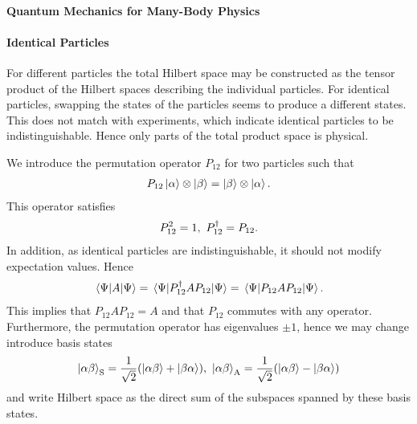 \paragraph{Quantum Mechanics for Many-Body Physics}

\paragraph{Identical Particles}
For different particles the total Hilbert space may be constructed as the tensor product of the Hilbert spaces describing the individual particles. For identical particles, swapping the states of the particles seems to produce a different states. This does not match with experiments, which indicate identical particles to be indistinguishable. Hence only parts of the total product space is physical.

We introduce the permutation operator $P_{12}$ for two particles such that
\begin{align*}
	P_{12}\ket{\alpha}\otimes\ket{\beta} = \ket{\beta}\otimes\ket{\alpha}.
\end{align*}
This operator satisfies
\begin{align*}
	P_{12}^{2} = 1,\ P_{12}^{\dagger} = P_{12}.
\end{align*}
In addition, as identical particles are indistinguishable, it should not modify expectation values. Hence
\begin{align*}
	\expval{A}{\Psi} = \expval{P_{12}^{\dagger}AP_{12}}{\Psi} = \expval{P_{12}AP_{12}}{\Psi}.
\end{align*}
This implies that $P_{12}AP_{12} = A$ and that $P_{12}$ commutes with any operator. Furthermore, the permutation operator has eigenvalues $\pm 1$, hence we may change introduce basis states
\begin{align*}
	\ket{\alpha\beta}_{\text{S}} = \frac{1}{\sqrt{2}}(\ket{\alpha\beta} + \ket{\beta\alpha}),\ \ket{\alpha\beta}_{\text{A}} = \frac{1}{\sqrt{2}}(\ket{\alpha\beta} - \ket{\beta\alpha})
\end{align*}
and write Hilbert space as the direct sum of the subspaces spanned by these basis states.

